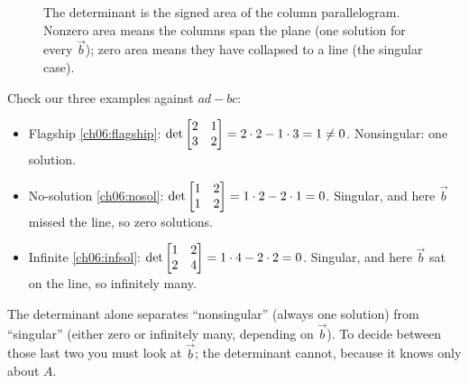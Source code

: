 \begin{figure}[H]
\centering
{}
\caption{The determinant is the signed area of the column parallelogram.
Nonzero area means the columns span the plane (one solution for every
$\vec b$); zero area means they have collapsed to a line (the singular
case).}
\label{ch06:detarea}
\end{figure}

Check our three examples against $ad-bc$:
\begin{itemize}
  \item Flagship \eqref{ch06:flagship}: $\det\begin{bmatrix}2&1\\3&2\end{bmatrix}=2\cdot2-1\cdot3=1\neq0$.
  Nonsingular: one solution.
  \item No-solution \eqref{ch06:nosol}: $\det\begin{bmatrix}1&2\\1&2\end{bmatrix}=1\cdot2-2\cdot1=0$.
  Singular, and here $\vec b$ missed the line, so zero solutions.
  \item Infinite \eqref{ch06:infsol}: $\det\begin{bmatrix}1&2\\2&4\end{bmatrix}=1\cdot4-2\cdot2=0$.
  Singular, and here $\vec b$ sat on the line, so infinitely many.
\end{itemize}
The determinant alone separates ``nonsingular'' (always one solution) from
``singular'' (either zero or infinitely many, depending on $\vec b$). To
decide between those last two you must look at $\vec b$; the determinant
cannot, because it knows only about $A$.

